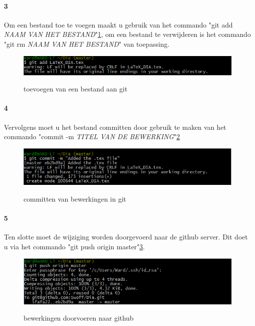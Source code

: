 \documentclass[12pt,a4paper]{report}
\begin{document}
\begin{flushleft}
\paragraph*{3}
Om een bestand toe te voegen maakt u gebruik van het commando "git add \textit{NAAM VAN HET BESTAND}"\ref{git_01}, om een bestand te verwijderen is het commando "git rm \emph{NAAM VAN HET BESTAND}" van toepassing.
\begin{figure}[H]
\includegraphics[scale=0.75]{images/git_01.png}
\label{git_01}
\centering 
\vspace{-10pt}
\caption{toevoegen van een bestand aan git}
\end{figure} 
\paragraph*{4}
Vervolgens moet u het bestand committen door gebruik te maken van het commando "commit -m \textit{TITEL VAN DE BEWERKING}"\ref{git_02}
\begin{figure}[H]
\includegraphics[scale=0.75]{images/git_02.png}
\label{git_02}
\centering 
\vspace{-10pt}
\caption{committen van bewerkingen in git}
\end{figure}  
\paragraph*{5}
Ten slotte moet de wijziging worden doorgevoerd naar de github server. Dit doet u via het commando "git push origin master"\ref{git_03}.
\begin{figure}[H]
\includegraphics[scale=0.75]{images/git_03.png}
\label{git_03}
\centering 
\vspace{-10pt}
\caption{bewerkingen doorvoeren naar github}
\end{figure} 

\end{flushleft}
\end{document}
